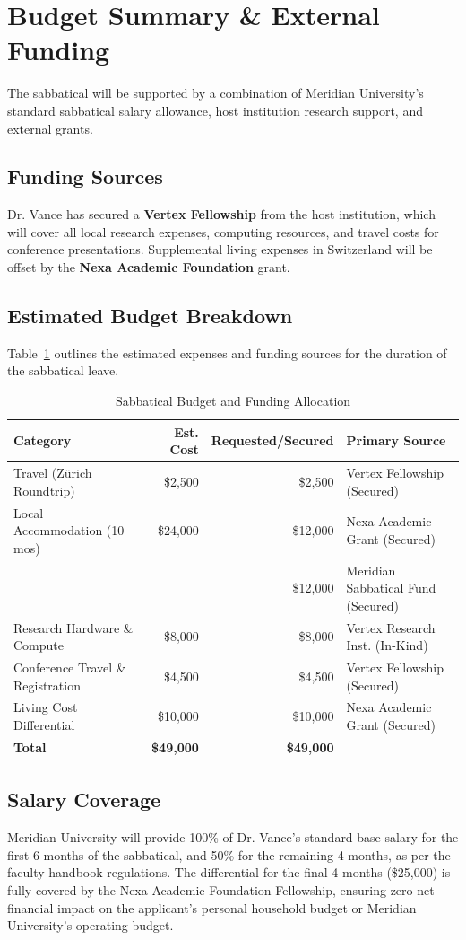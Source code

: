 \section{Budget Summary \& External Funding}
The sabbatical will be supported by a combination of Meridian University's standard sabbatical salary allowance, host institution research support, and external grants.

\subsection{Funding Sources}
Dr. Vance has secured a \textbf{Vertex Fellowship} from the host institution, which will cover all local research expenses, computing resources, and travel costs for conference presentations. Supplemental living expenses in Switzerland will be offset by the \textbf{Nexa Academic Foundation} grant.

\subsection{Estimated Budget Breakdown}
Table~\ref{tab:budget} outlines the estimated expenses and funding sources for the duration of the sabbatical leave.

\begin{table}[h!]
\centering
\caption{Sabbatical Budget and Funding Allocation}
\label{tab:budget}
\begin{tabularx}{\textwidth}{>{\raggedright\arraybackslash}X r r >{\raggedright\arraybackslash}p{5cm}}
\toprule
\textbf{Category} & \textbf{Est. Cost} & \textbf{Requested/Secured} & \textbf{Primary Source} \\
\midrule
Travel (Zürich Roundtrip) & \$2,500 & \$2,500 & Vertex Fellowship (Secured) \\
Local Accommodation (10 mos) & \$24,000 & \$12,000 & Nexa Academic Grant (Secured) \\
{} & {} & \$12,000 & Meridian Sabbatical Fund (Secured) \\
Research Hardware \& Compute & \$8,000 & \$8,000 & Vertex Research Inst. (In-Kind) \\
Conference Travel \& Registration & \$4,500 & \$4,500 & Vertex Fellowship (Secured) \\
Living Cost Differential & \$10,000 & \$10,000 & Nexa Academic Grant (Secured) \\
\midrule
\textbf{Total} & \textbf{\$49,000} & \textbf{\$49,000} & \\
\bottomrule
\end{tabularx}
\end{table}

\subsection{Salary Coverage}
Meridian University will provide 100\% of Dr. Vance’s standard base salary for the first 6 months of the sabbatical, and 50\% for the remaining 4 months, as per the faculty handbook regulations. The differential for the final 4 months (\$25,000) is fully covered by the Nexa Academic Foundation Fellowship, ensuring zero net financial impact on the applicant's personal household budget or Meridian University's operating budget.
